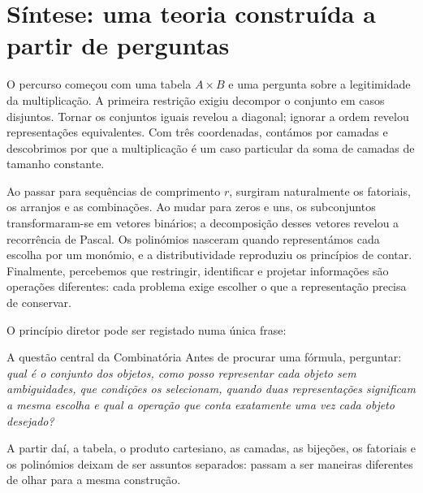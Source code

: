 \documentclass[11pt,a4paper,oneside]{book}
\begin{document}
\chapter*{Síntese: uma teoria construída a partir de perguntas}
O percurso começou com uma tabela $A\times B$ e uma pergunta sobre a legitimidade da multiplicação. A primeira restrição exigiu decompor o conjunto em casos disjuntos. Tornar os conjuntos iguais revelou a diagonal; ignorar a ordem revelou representações equivalentes. Com três coordenadas, contámos por camadas e descobrimos por que a multiplicação é um caso particular da soma de camadas de tamanho constante.

Ao passar para sequências de comprimento $r$, surgiram naturalmente os fatoriais, os arranjos e as combinações. Ao mudar para zeros e uns, os subconjuntos transformaram-se em vetores binários; a decomposição desses vetores revelou a recorrência de Pascal. Os polinómios nasceram quando representámos cada escolha por um monómio, e a distributividade reproduziu os princípios de contar. Finalmente, percebemos que restringir, identificar e projetar informações são operações diferentes: cada problema exige escolher o que a representação precisa de conservar.

O princípio diretor pode ser registado numa única frase:
\begin{descobertabox}{A questão central da Combinatória}
Antes de procurar uma fórmula, perguntar: \emph{qual é o conjunto dos objetos, como posso representar cada objeto sem ambiguidades, que condições os selecionam, quando duas representações significam a mesma escolha e qual a operação que conta exatamente uma vez cada objeto desejado?}
\end{descobertabox}
A partir daí, a tabela, o produto cartesiano, as camadas, as bijeções, os fatoriais e os polinómios deixam de ser assuntos separados: passam a ser maneiras diferentes de olhar para a mesma construção.

\appendix
\end{document}
